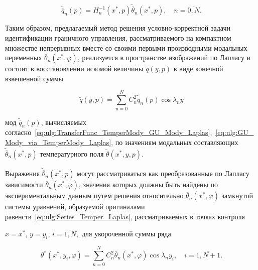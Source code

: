 \begin{equation}\label{eq:ulg:GU_Mody_via_TemperMody_Laplas}

{\widetilde  {\overline q} _n}(p) =  H_n^{ - 1}(x^*,p){\widetilde  {\overline \theta } _n}(x^*,p),\quad n = \overline {0,N} .    

\end{equation}



Таким образом, предлагаемый метод решения условно-корректной задачи идентификации граничного управления, рассматриваемого на компактном множестве непрерывных вместе со своими первыми производными модальных переменных   $  {\overline \theta  _n}(x^*,\varphi )$, реализуется в пространстве изображений по Лапласу и состоит в восстановлении искомой величины $  \widetilde q(y,p)$  в виде конечной взвешенной суммы

\begin{equation}\label{eq:ulg:Finit_Series_GU_Laplas}

\widetilde q(y,p) = \sum\limits_{n = 0}^N {C_n^2{\widetilde  {\overline q} _n}(p)}   \cos \lambda_n y    

\end{equation}

мод ${\widetilde  {\overline q} _n}(p) $, вычисляемых согласно~\eqref{eq:ulg:TransferFunc_TemperMody_GU_Mody_Laplas},~\eqref{eq:ulg:GU_Mody_via_TemperMody_Laplas}, по значениям модальных составляющих  $ {\widetilde  {\overline \theta } _n}(x^*,p) $ температурного поля  $  \widetilde \theta (x^*,y,p) $.  

Выражения  $ {\widetilde  {\overline \theta } _n}(x^*,p)   $  могут рассматриваться как преобразованные по Лапласу зависимости  $  {\overline \theta  _n}(x^*,\varphi ) $, значения которых должны быть найдены по экспериментальным данным  путем решения относительно  $  {\overline \theta  _n}(x^*,\varphi ) $  замкнутой системы уравнений, образуемой оригиналами равенств~\eqref{eq:ulg:Series_Temper_Laplas}, рассматриваемых в точках контроля 

$x = {x^*}$, $y = {y_i}$, $i = \overline {1,N} ,$ для укороченной суммы ряда

\begin{equation}\label{eq:ulg:Finit_Series_Experiment}

{\theta ^*}(x^*,{y_i},\varphi ) = \sum\limits_{n = 0}^N {C_n^2{{\overline \theta  }_n}(x^*,\varphi )}  \cos \lambda_n{y_i},\quad i = \overline {1,N + 1}.    

\end{equation}



